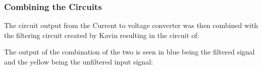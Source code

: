 \documentclass{article}
\begin{document}
\subsubsection{Combining the Circuits}
The circuit output from the Current to voltage converter was then combined with the filtering circuit created by Kavin resulting in the circuit of: 
\begin{center}
\end{center}
\newpage
The output of the combination of the two is seen in blue being the filtered signal and the yellow being the unfiltered input signal:
\begin{center}
\end{center}
\end{document}
